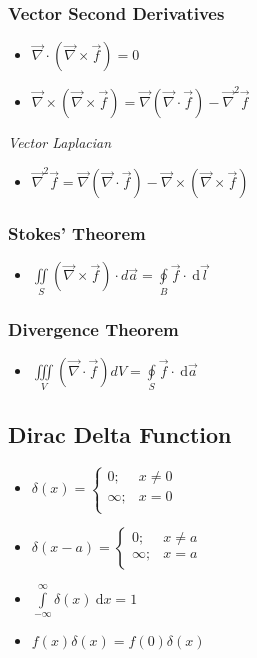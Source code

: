 \documentclass[]{report}
\newcommand \tab[1][1cm]{\hspace*{#1}}
\newcommand{\dn}[1]{\ \mathrm{d}#1}
\newcommand{\curl}{\vec{\nabla}\times}
\newcommand{\divergence}{\vec{\nabla}\cdot}
\newcommand{\itemt}{\item \tab}
\begin{document}
\subsubsection{Vector Second Derivatives}

\begin{itemize}
\itemt \(\divergence(\curl\vec{f}) = 0\)
\itemt \( \curl(\curl\vec{f}) = \vec{\nabla}(\divergence\vec{f})-\vec{\nabla}^2\vec{f}\)
\end{itemize}

\textit{Vector Laplacian}
\begin{itemize}
\itemt \( \vec{\nabla}^2 \vec{f} = \vec{\nabla} (\divergence\vec{f}) - \curl (\curl\vec{f})\)
\end{itemize}


\subsubsection{Stokes' Theorem}
\begin{itemize}
\itemt \( \iint\limits_{S} (\curl{\vec{f}})\cdot d\vec{a} = \oint\limits_{B} \vec{f}\cdot \dn\vec{l} \)
\end{itemize}


\subsubsection{Divergence Theorem}
\begin{itemize}
\itemt \( \iiint\limits_{V} (\divergence{\vec{f}}) dV = \oint\limits_{S} \vec{f}\cdot \dn\vec{a} \)
\end{itemize}


\subsection{Dirac Delta Function}
\begin{itemize}
\itemt  \( \delta(x) = \begin{cases} 
      0; & x\neq 0 \\
      \infty; & x= 0 \\
   \end{cases}
\)
\itemt  \( \delta(x-a) = \begin{cases} 
      0; & x\neq a \\
      \infty; & x= a \\
   \end{cases}
\)
\itemt \( \int\limits_{-\infty}^{\infty} \delta(x) \dn x = 1\)
\itemt \( f(x)\delta(x) = f(0)\delta(x) \)
\end{itemize}
\end{document}
